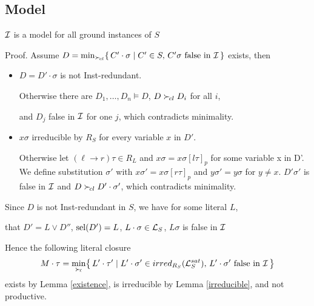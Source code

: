 \documentclass[%
handout,
]{beamer}
\begin{document}
\subsection{Model}
\begin{frame}[allowframebreaks]

    \begin{lemma}
        $\mathcal{I}$ is a model for all ground instances of $S$
    \end{lemma}

    \begin{block}{Proof.}
        Assume $
            D = \min_{\mathrel\succ_{\!cl}}\{\,
            C'\cdot\sigma \mid C'\in S,\,
            C'\sigma\text{ false in }\mathcal{I}\,
            \}
            $ exists, then
    \end{block}
    \begin{itemize}
        \item $D = D'\cdot\sigma$ is not Inst-redundant.
        \vspace{0.2em}

        Otherwise there are
        $D_1,\ldots,D_n\models D$, $D\mathrel\succ_{\!cl} D_i$ for all $i$,

        and $D_j$ false in $\mathcal{I}$ for one $j$, which contradicts minimality.

        \item $x\sigma$ irreducible by $R_S$ for every variable $x$ in $D'$.
        \vspace{0.2em}

        Otherwise let $(\ell\to r)\tau\in R_L$ and $x\sigma = x\sigma[l\tau]_p$ for some variable x in D'.
        We define substitution $\sigma'$ with $x\sigma' = x\sigma[r\tau]_p$ and $y\sigma' = y\sigma$ for $y\neq x$.
        $D'\sigma'$ is false in $\mathcal{I}$ and $D\mathrel\succ_{\!cl} D'\cdot\sigma'$,
        which contradicts minimality.
    \end{itemize}

\framebreak

    Since $D$ is not Inst-redundant in $S$,
    we have for some literal $L$,

    that $D' = L\lor D''$, $\operatorname{sel}(D') = L$, $L\cdot\sigma\in\mathcal{L}_S$,
    $L\sigma$ is false in $\mathcal{I}$
    \vspace{0.7em}

    Hence the following literal closure
    \begin{gather*}
        M\cdot\tau = \min_{\mathrel\succ_{\!\ell}}\!
\left\{\,
    L'\cdot\tau' \mid
    L'\cdot\sigma' \in irred_{R_S}(\mathcal{L}_S^{sat}),\,
    L'\cdot\sigma'\text{ false in }\mathcal{I}\,
\right\}
    \end{gather*}
    exists by Lemma \ref{existence}, is irreducible by Lemma \ref{irreducible},
    and not productive.


\end{frame}
\end{document}
